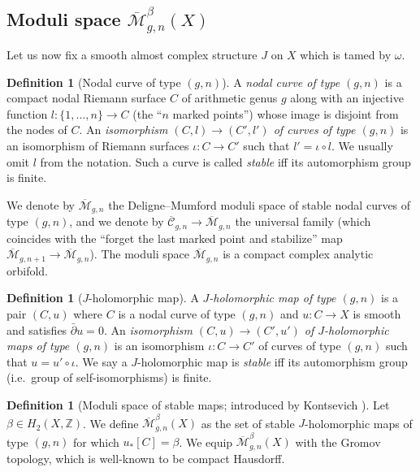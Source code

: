 \documentclass[12pt]{article}
\theoremstyle{definition}
\newtheorem{definition}[theorem]{Definition}
\theoremstyle{remark}
\numberwithin{equation}{subsection}
\newcommand{\ZZ}{\mathbb Z}
\newcommand{\Mbar}{\overline{\mathcal M}}
\newcommand{\Cbar}{\overline{\mathcal C}}
\newcommand{\delbar}{\bar\partial}
\begin{document}
\subsection{Moduli space \texorpdfstring{$\Mbar_{g,n}^\beta(X)$}{Mbar\_g,n\textasciicircum beta(X)}}

Let us now fix a smooth almost complex structure $J$ on $X$ which is tamed by $\omega$.

\begin{definition}[Nodal curve of type $(g,n)$]
A \emph{nodal curve of type $(g,n)$} is a compact nodal Riemann surface $C$ of arithmetic genus $g$ along with an injective function $l:\{1,\ldots,n\}\to C$ (the ``$n$ marked points'') whose image is disjoint from the nodes of $C$.  An \emph{isomorphism $(C,l)\to(C',l')$ of curves of type $(g,n)$} is an isomorphism of Riemann surfaces $\iota:C\to C'$ such that $l'=\iota\circ l$.  We usually omit $l$ from the notation.  Such a curve is called \emph{stable} iff its automorphism group is finite.
\end{definition}

We denote by $\Mbar_{g,n}$ the Deligne--Mumford moduli space of stable nodal curves of type $(g,n)$, and we denote by $\Cbar_{g,n}\to\Mbar_{g,n}$ the universal family (which coincides with the ``forget the last marked point and stabilize'' map $\Mbar_{g,n+1}\to\Mbar_{g,n}$).  The moduli space $\Mbar_{g,n}$ is a compact complex analytic orbifold.

\begin{definition}[$J$-holomorphic map]
A \emph{$J$-holomorphic map of type $(g,n)$} is a pair $(C,u)$ where $C$ is a nodal curve of type $(g,n)$ and $u:C\to X$ is smooth and satisfies $\delbar u=0$.  An \emph{isomorphism $(C,u)\to(C',u')$ of $J$-holomorphic maps of type $(g,n)$} is an isomorphism $\iota:C\to C'$ of curves of type $(g,n)$ such that $u=u'\circ\iota$.  We say a $J$-holomorphic map is \emph{stable} iff its automorphism group (i.e.\ group of self-isomorphisms) is finite.
\end{definition}

\begin{definition}[Moduli space of stable maps; introduced by Kontsevich \cite{kontsevich}]
Let $\beta\in H_2(X,\ZZ)$.  We define $\Mbar_{g,n}^\beta(X)$ as the set of stable $J$-holomorphic maps of type $(g,n)$ for which $u_\ast[C]=\beta$.  We equip $\Mbar_{g,n}^\beta(X)$ with the Gromov topology, which is well-known to be compact Hausdorff.
\end{definition}
\end{document}
